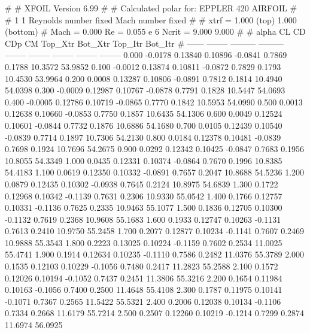 #  
#       XFOIL         Version 6.99
#  
# Calculated polar for: EPPLER 420 AIRFOIL                              
#  
# 1 1 Reynolds number fixed          Mach number fixed         
#  
# xtrf =   1.000 (top)        1.000 (bottom)  
# Mach =   0.000     Re =     0.055 e 6     Ncrit =   9.000  9.000
#  
#   alpha    CL        CD       CDp       CM     Top_Xtr  Bot_Xtr  Top_Itr  Bot_Itr
#  ------ -------- --------- --------- -------- -------- -------- -------- --------
   0.000  -0.0178   0.13840   0.10896  -0.0841   0.7869   0.1788  10.3572  53.9852
   0.100  -0.0012   0.13874   0.10811  -0.0872   0.7829   0.1793  10.4530  53.9964
   0.200   0.0008   0.13287   0.10806  -0.0891   0.7812   0.1814  10.4940  54.0398
   0.300  -0.0009   0.12987   0.10767  -0.0878   0.7791   0.1828  10.5447  54.0693
   0.400  -0.0005   0.12786   0.10719  -0.0865   0.7770   0.1842  10.5953  54.0990
   0.500   0.0013   0.12638   0.10660  -0.0853   0.7750   0.1857  10.6435  54.1306
   0.600   0.0049   0.12524   0.10601  -0.0844   0.7732   0.1876  10.6886  54.1680
   0.700   0.0105   0.12439   0.10540  -0.0839   0.7714   0.1897  10.7306  54.2130
   0.800   0.0184   0.12378   0.10481  -0.0839   0.7698   0.1924  10.7696  54.2675
   0.900   0.0292   0.12342   0.10425  -0.0847   0.7683   0.1956  10.8055  54.3349
   1.000   0.0435   0.12331   0.10374  -0.0864   0.7670   0.1996  10.8385  54.4183
   1.100   0.0619   0.12350   0.10332  -0.0891   0.7657   0.2047  10.8688  54.5236
   1.200   0.0879   0.12435   0.10302  -0.0938   0.7645   0.2124  10.8975  54.6839
   1.300   0.1722   0.12968   0.10342  -0.1139   0.7631   0.2306  10.9330  55.0542
   1.400   0.1766   0.12757   0.10331  -0.1136   0.7625   0.2335  10.9463  55.1077
   1.500   0.1836   0.12705   0.10300  -0.1132   0.7619   0.2368  10.9608  55.1683
   1.600   0.1933   0.12747   0.10263  -0.1131   0.7613   0.2410  10.9750  55.2458
   1.700   0.2077   0.12877   0.10234  -0.1141   0.7607   0.2469  10.9888  55.3543
   1.800   0.2223   0.13025   0.10224  -0.1159   0.7602   0.2534  11.0025  55.4741
   1.900   0.1914   0.12634   0.10235  -0.1110   0.7586   0.2482  11.0376  55.3789
   2.000   0.1535   0.12103   0.10229  -0.1056   0.7480   0.2417  11.2823  55.2588
   2.100   0.1572   0.12026   0.10194  -0.1052   0.7437   0.2451  11.3806  55.3216
   2.200   0.1654   0.11984   0.10163  -0.1056   0.7400   0.2500  11.4648  55.4108
   2.300   0.1787   0.11975   0.10141  -0.1071   0.7367   0.2565  11.5422  55.5321
   2.400   0.2006   0.12038   0.10134  -0.1106   0.7334   0.2668  11.6179  55.7214
   2.500   0.2507   0.12260   0.10219  -0.1214   0.7299   0.2874  11.6974  56.0925
